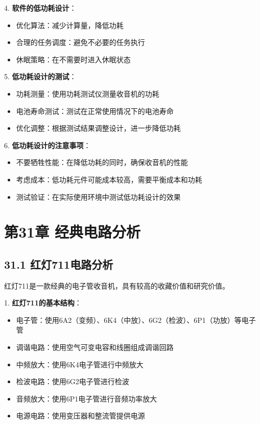 \documentclass[12pt,UTF8]{ctexbook}
\begin{document}
4. \textbf{软件的低功耗设计}：
   \begin{itemize}[leftmargin=3.5em]
   \item 优化算法：减少计算量，降低功耗
   \item 合理的任务调度：避免不必要的任务执行
   \item 休眠策略：在不需要时进入休眠状态
   \end{itemize}

5. \textbf{低功耗设计的测试}：
   \begin{itemize}[leftmargin=3.5em]
   \item 功耗测量：使用功耗测试仪测量收音机的功耗
   \item 电池寿命测试：测试在正常使用情况下的电池寿命
   \item 优化调整：根据测试结果调整设计，进一步降低功耗
   \end{itemize}

6. \textbf{低功耗设计的注意事项}：
   \begin{itemize}[leftmargin=3.5em]
   \item 不要牺牲性能：在降低功耗的同时，确保收音机的性能
   \item 考虑成本：低功耗元件可能成本较高，需要平衡成本和功耗
   \item 测试验证：在实际使用环境中测试低功耗设计的效果
   \end{itemize}

\chapter*{第31章 经典电路分析}
\section*{31.1 红灯711电路分析}

红灯711是一款经典的电子管收音机，具有较高的收藏价值和研究价值。

1. \textbf{红灯711的基本结构}：
   \begin{itemize}[leftmargin=3.5em]
   \item 电子管：使用6A2（变频）、6K4（中放）、6G2（检波）、6P1（功放）等电子管
   \item 调谐电路：使用空气可变电容和线圈组成调谐回路
   \item 中频放大：使用6K4电子管进行中频放大
   \item 检波电路：使用6G2电子管进行检波
   \item 音频放大：使用6P1电子管进行音频功率放大
   \item 电源电路：使用变压器和整流管提供电源
   \end{itemize}
\end{document}

